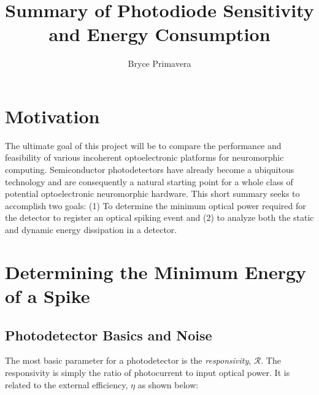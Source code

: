 \documentclass[12pt]{article}
\begin{document}
 
 
\title{Summary of Photodiode Sensitivity and Energy Consumption}
\author{Bryce Primavera}

\maketitle
\section{Motivation}
\quad The ultimate goal of this project will be to compare the performance and feasibility of various incoherent optoelectronic platforms for neuromorphic computing. Semiconductor photodetectors have already become a ubiquitous technology and are consequently a natural starting point for a whole class of potential optoelectronic neuromorphic hardware. This short summary seeks to accomplish two goals: (1) To determine the minimum optical power required for the detector to register an optical spiking event and (2) to analyze both the static and dynamic energy dissipation in a detector.

\section{Determining the Minimum Energy of a Spike}

\subsection{Photodetector Basics and Noise}

\quad The most basic parameter for a photodetector is the \textit{responsivity}, $\mathcal{R}$. The responsivity is simply the ratio of photocurrent to input optical power. It is related to the external efficiency, $\eta$ as shown below:
\end{document}
